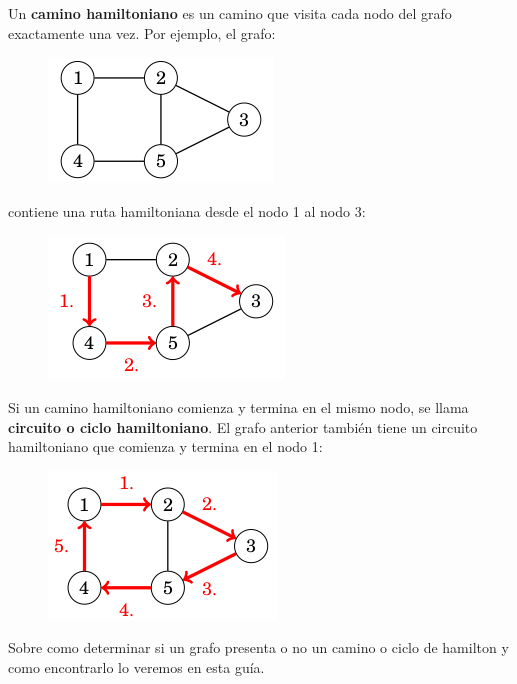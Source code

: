 Un \textbf{camino hamiltoniano} es un camino que visita cada nodo del grafo exactamente una vez. Por ejemplo, el grafo:

\begin{figure}[h!]
	\centering
	\includegraphics[width=0.3\linewidth]{img/hamilton_path}

	\label{fig:hamiltonpath}
\end{figure}


contiene una ruta hamiltoniana desde el nodo 1 al nodo 3:

\begin{figure}[h!]
	\centering
	\includegraphics[width=0.3\linewidth]{img/hamilton_path_2}
	
	\label{fig:hamiltonpath2}
\end{figure}

Si un camino hamiltoniano comienza y termina en el mismo nodo, se llama \textbf{circuito o ciclo hamiltoniano}. El grafo anterior también tiene un circuito hamiltoniano que comienza
y termina en el nodo 1:

\begin{figure}[h!]
	\centering
	\includegraphics[width=0.3\linewidth]{img/hamilton_path_3}
	
	\label{fig:hamiltonpath3}
\end{figure}

Sobre como determinar si un grafo presenta o no un camino o ciclo de hamilton y como encontrarlo lo
veremos en esta guía.
